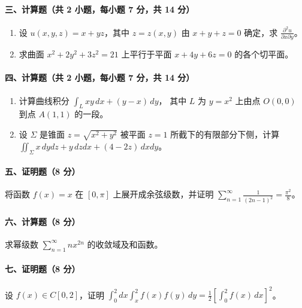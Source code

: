 \paragraph*{三、计算题（共 2 小题，每小题 7 分，共 14 分）}

\begin{enumerate}
  \item 设 $u(x,y,z)=x+yz$，其中 $z=z(x,y)$ 由 $x+y+z=0$ 确定，求 \(\displaystyle \frac{\partial^2u}{\partial x\partial y}\)。

  \item 求曲面 $x^2+2y^2+3z^2=21$ 上平行于平面 $x+4y+6z=0$ 的各个切平面。
\end{enumerate}

\paragraph*{四、计算题（共 2 小题，每小题 7 分，共 14 分）}

\begin{enumerate}
  \item 计算曲线积分 \(\displaystyle \int_L xy\,dx+(y-x)\,dy\)，
  其中 $L$ 为 $y=x^2$ 上由点 $O(0,0)$ 到点 $A(1,1)$ 的一段。

  \item 设 $\Sigma$ 是锥面 $z=\sqrt{x^2+y^2}$ 被平面 $z=1$ 所截下的有限部分下侧，计算 \(\displaystyle \iint_{\Sigma}x\,dydz+y\,dzdx+(4-2z)\,dxdy\)。
\end{enumerate}

\paragraph*{五、证明题（8 分）}

将函数 $f(x)=x$ 在 $[0,\pi]$ 上展开成余弦级数，并证明
\(\displaystyle \sum_{n=1}^{\infty}\frac1{(2n-1)^2}=\frac{\pi^2}{8}\)。

\paragraph*{六、计算题（8 分）}

求幂级数 \(\displaystyle \sum_{n=1}^{\infty}n x^{2n}\) 的收敛域及和函数。

\paragraph*{七、证明题（8 分）}

设 $f(x)\in C[0,2]$，证明
\(\displaystyle \int_0^2 dx\int_x^2 f(x)f(y)\,dy
  =\frac12\left[\int_0^2 f(x)\,dx\right]^2\)。

